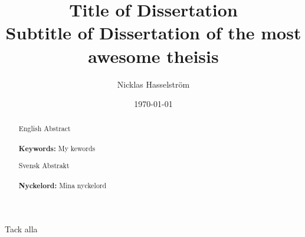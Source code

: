 \documentclass[12pt,twoside]{Classfiles/kau_report}
\title{Title of Dissertation\\ 
\large Subtitle of Dissertation of the most awesome theisis}
\author{Nicklas Hasselstr\"om}
\date{\today}
\begin{document}
\makekautitle
\makeswekautitle

\copyrightpage

\begin{frontmatter}

\approved

\begin{abstract}




English Abstract
\\
\\
\textbf{Keywords:} My kewords


\end{abstract}
\cleardoublepage


\renewcommand{\abstractname}{Abstract (In Swedish)}
\begin{abstract}
Svensk Abstrakt
\\
\\
\textbf{Nyckelord:} Mina nyckelord

\end{abstract}
\cleardoublepage

\begin{acknowledgements}
Tack alla
\end{acknowledgements}
\cleardoublepage

  \tableofcontents
  \cleardoublepage

  \listoffigures
  \cleardoublepage

  \listoftables
  \cleardoublepage
  
  \lstlistoflistings
  \cleardoublepage

\end{frontmatter}
\end{document}
